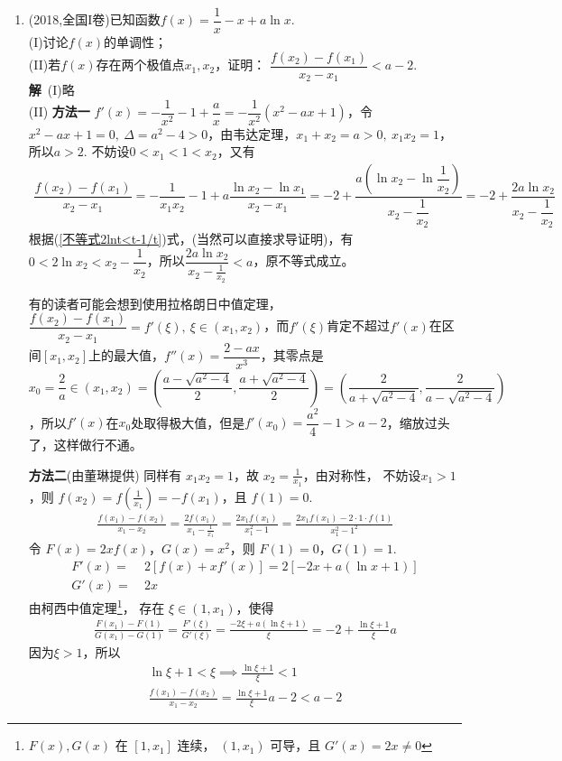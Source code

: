 \begin{enumerate}[label={【\textbf{例\thechapter.\arabic*}】},
 leftmargin=\inteval{\myenumleftmargin}pt,
 itemsep=\inteval{\myenumitempsep}pt,
 itemindent=\inteval{\myenumitemindent}pt]
\item (2018,全国I卷)已知函数$ f(x)=\dfrac{1}{x}-x+a\ln x $.\\
(I)讨论$ f(x) $的单调性；\\
(II)若$ f(x) $存在两个极值点$ x_1,x_2 $，证明：
$ \dfrac{f(x_2)-f(x_1)}{x_2-x_1}<a-2 $. \\
\textbf{解}\ (I)略 \\
(II) \textbf{方法一} $ f'(x)=-\dfrac{1}{x^2}-1+\dfrac{a}{x}=-\dfrac{1}{x^2}(x^2-ax+1) $，令$ x^2-ax+1=0,\ \Delta=a^2-4>0 $，由韦达定理，$ x_1+x_2=a>0,\ x_1x_2=1 $，所以$ a>2 $. 不妨设$ 0<x_1<1<x_2 $，又有
\begin{align*}
	\dfrac{f(x_2)-f(x_1)}{x_2-x_1}=-\dfrac{1}{x_1x_2}-1+
	a\dfrac{\ln x_2-\ln x_1}{x_2-x_1} 
	=-2+\dfrac{a(\ln x_2-\ln \dfrac{1}{x_2})}
	{x_2-\dfrac{1}{x_2}} 	
	=-2+\dfrac{2a\ln x_2}{x_2-\dfrac{1}{x_2}}
\end{align*}
根据(\ref{不等式2lnt<t-1/t})式，(当然可以直接求导证明)，有$ 0<2\ln x_2<x_2-\dfrac{1}{x_2} $，所以$ \dfrac{2a\ln x_2}{x_2-\frac{1}{x_2}}<a $，原不等式成立。

有的读者可能会想到使用拉格朗日中值定理，$ \dfrac{f(x_2)-f(x_1)}{x_2-x_1}=f'(\xi),\  \xi\in(x_1,x_2) $，而$f'(\xi) $肯定不超过$ f'(x) $在区间$ [x_1,x_2] $上的最大值，$ f''(x)=\dfrac{2-ax}{x^3} $，其零点是$ x_0=\dfrac{2}{a}\in (x_1,x_2)=\left(\dfrac{a-\sqrt{a^2-4}}{2},\dfrac{a+\sqrt{a^2-4}}{2}\right)=\left(\dfrac{2}{a+\sqrt{a^2-4}},\dfrac{2}{a-\sqrt{a^2-4}}\right) $，所以$ f'(x) $在$ x_0 $处取得极大值，但是$ f'(x_0)=\dfrac{a^2}{4}-1>a-2 $，缩放过头了，这样做行不通。

\textbf{方法二}(由董琳提供) 同样有 \(x_1x_2 = 1\)，故 \(x_2 = \frac{1}{x_1}\)，由对称性，
不妨设$x_1 > 1$，则 \(f(x_2)=f(\frac{1}{x_1})=-f(x_1)\)，且 \(f(1) = 0\).
\begin{gather*}
    \frac{f(x_1)-f(x_2)}{x_1-x_2} 
    = \frac{2 f(x_1)}{x_1-\frac{1}{x_1}}
    = \frac{2x_1 f(x_1)}{x_1^2 - 1} 
    = \frac{2x_1 f(x_1) - 2\cdot 1 \cdot f(1)}{x_1^2 - 1^2}
\end{gather*}
令 \(F(x) = 2x f(x)\)，\(G(x) = x^2\)，则 \(F(1) = 0\)，\(G(1) = 1\).
\begin{align*}
    F'(x) =&\ 2\left[f(x) + x f'(x)\right]=2[-2x+a(\ln x+1)] \\
    G'(x) =&\ 2x
\end{align*}
由柯西中值定理\footnote{\(F(x),G(x)\) 在 \([1,x_1]\) 连续，
    \((1,x_1)\) 可导，且 \(G'(x)=2x \neq 0\)}，
存在 \(\xi \in (1, x_1)\)，使得
\begin{gather*}
    \frac{F(x_1) - F(1)}{G(x_1) - G(1)} = \frac{F'(\xi)}{G'(\xi)}
    =\frac{-2\xi+a(\ln \xi+1)}{\xi}=-2+\frac{\ln \xi + 1}{\xi}a
\end{gather*}
因为$\xi >1 $，所以
\begin{gather*}
    \ln \xi + 1 < \xi \implies \frac{\ln \xi + 1}{\xi} < 1    \\
    \frac{f(x_1)-f(x_2)}{x_1-x_2} = \frac{\ln \xi + 1}{\xi}a - 2 < a - 2 
\end{gather*}


\end{enumerate}
